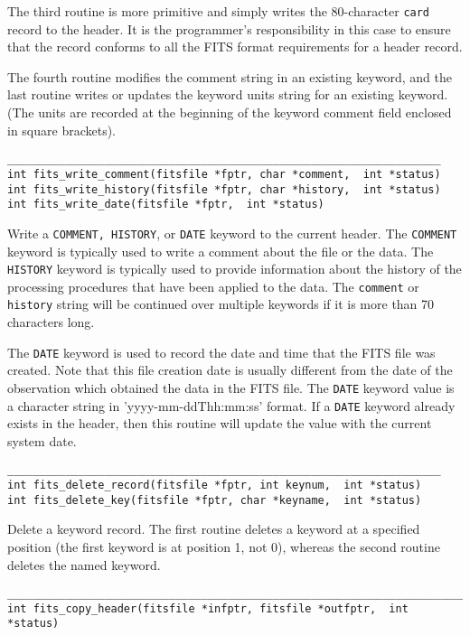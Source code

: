 \documentclass[11pt]{article}
\begin{document}
The third routine is more primitive and simply writes the 80-character
{\tt card} record to the header.  It is the programmer's responsibility
in this case to ensure that the record conforms to all the FITS format
requirements for a header record.

The fourth routine modifies the comment string in an existing keyword,
and the last routine writes or updates the keyword units string for an
existing keyword.  (The units are recorded at the beginning of the
keyword comment field enclosed in square brackets).

\begin{verbatim}
___________________________________________________________________
int fits_write_comment(fitsfile *fptr, char *comment,  int *status)
int fits_write_history(fitsfile *fptr, char *history,  int *status)
int fits_write_date(fitsfile *fptr,  int *status)
\end{verbatim}

Write a {\tt COMMENT, HISTORY}, or {\tt DATE} keyword to the current
header.  The {\tt COMMENT} keyword is typically used to write a comment
about the file or the data.  The {\tt HISTORY} keyword is typically
used to provide information about the history of the processing
procedures that have been applied to the data.  The {\tt comment} or
{\tt history} string will be continued over multiple keywords if it is
more than 70 characters long.

The {\tt DATE} keyword is used to record the date and time that the
FITS file was created.  Note that this file creation date is usually
different from the date of the observation which obtained the data in
the FITS file.  The {\tt DATE} keyword value is a character string in
'yyyy-mm-ddThh:mm:ss' format. If a {\tt DATE} keyword already exists in
the header, then this routine will update the value with the current
system date.

\begin{verbatim}
___________________________________________________________________
int fits_delete_record(fitsfile *fptr, int keynum,  int *status)
int fits_delete_key(fitsfile *fptr, char *keyname,  int *status)
\end{verbatim}

Delete a keyword record. The first routine deletes a keyword at a
specified position (the first keyword is at position 1, not 0),
whereas the second routine deletes the named keyword.

\begin{verbatim}
_______________________________________________________________________
int fits_copy_header(fitsfile *infptr, fitsfile *outfptr,  int *status)
\end{verbatim}
\end{document}
